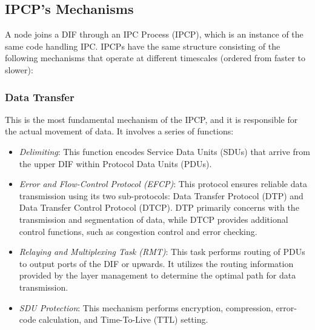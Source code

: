 \documentclass{ieeeaccess}
\begin{document}
\subsection{IPCP's Mechanisms}

A node joins a DIF through an IPC Process (IPCP), which is an instance of the same code handling IPC. IPCPs have the same structure consisting of the following mechanisms that operate at different timescales (ordered from faster to slower):

\subsubsection{Data Transfer}
This is the most fundamental mechanism of the IPCP, and it is responsible for the actual movement of data. It involves a series of functions:
\begin{itemize}
	\item \textit{Delimiting}: This function encodes Service Data Units (SDUs) that arrive from the upper DIF within Protocol Data Units (PDUs).
	\item \textit{Error and Flow-Control Protocol (EFCP)}: This protocol ensures reliable data transmission using its two sub-protocols: Data Transfer Protocol (DTP) and Data Transfer Control Protocol (DTCP). DTP primarily concerns with the transmission and segmentation of data, while DTCP provides additional control functions, such as congestion control and error checking.
	\item \textit{Relaying and Multiplexing Task (RMT)}: This task performs routing of PDUs to output ports of the DIF or upwards. It utilizes the routing information provided by the layer management to determine the optimal path for data transmission.
	\item \textit{SDU Protection}: This mechanism performs encryption, compression, error-code calculation, and Time-To-Live (TTL) setting.
\end{itemize}
\end{document}
